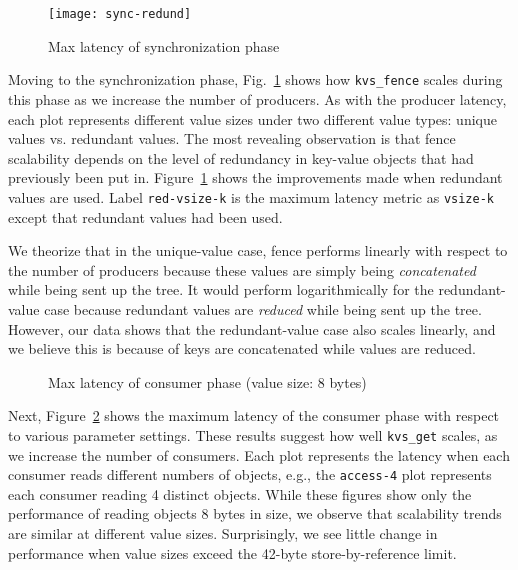 \begin{figure}
\centering
\texttt{[image: sync-redund]}
\caption{Max latency of synchronization phase}
\vspace{-.4cm}	
\label{fig:sync}
\end{figure}
 

Moving to the synchronization phase, Fig.~\ref{fig:sync} shows 
how {\tt kvs\_fence} scales during this phase
as we increase the number of producers. 
As with the producer latency,
each plot represents different value sizes under two different
value types: unique values vs. redundant values.
The most revealing observation is that
fence scalability depends on the level of
redundancy in key-value objects that had previously 
been put in. Figure~\ref{fig:sync} 
shows the improvements made when redundant values are used. 
Label {\tt red-vsize-k} is the maximum latency metric
as {\tt vsize-k} except that 
redundant values had been used.

We theorize that in the unique-value case, fence performs 
linearly with respect to the number of
producers because these values are simply being {\em concatenated} while
being sent up the tree. It would perform logarithmically for the redundant-value case
because redundant values are {\em reduced} while being sent 
up the tree. However, our data shows that the redundant-value case
also scales linearly, and we believe this is because of keys 
are concatenated while values are reduced. 

\ifcomments
{}
\fi

\begin{figure}[ht]
\centering
\begin{subfigure}[With single-directory layout]{
  \texttt{[image: consumer-1-dir]}
  \label{fig:cons:dir}
}%
\end{subfigure}
\begin{subfigure}[Improvements with multiple directories]{
  \texttt{[image: consumer-dist-dir]}
  \label{fig:cons:dirs}
}%
\end{subfigure}
\caption{Max latency of consumer phase (value size: 8 bytes)}
\vspace{-.3cm}
\label{fig:consumer}
\end{figure}

Next, Figure~\ref{fig:consumer} shows the maximum latency of the consumer
phase with respect to various parameter settings. 
These results suggest how well {\tt kvs\_get}
scales, as we increase the number of consumers. Each plot represents
the latency when each consumer reads different numbers of 
objects, e.g., the {\tt access-4} plot represents each consumer reading
4 distinct objects.  While these figures show only the performance of reading
objects 8 bytes in size, we observe that 
scalability trends are similar at different value sizes.
Surprisingly, we see little change in performance when value sizes
exceed the 42-byte store-by-reference limit.

